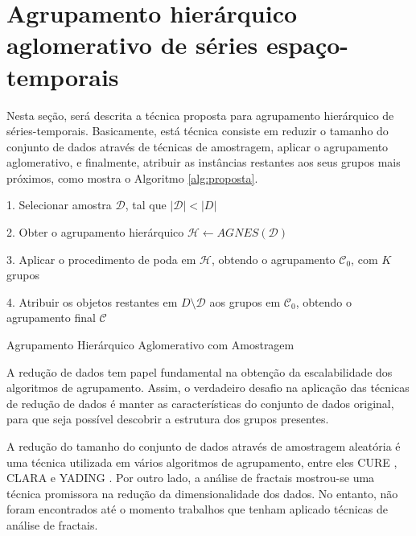 \section{Agrupamento hierárquico aglomerativo de séries espaço-temporais}

Nesta seção, será descrita a técnica proposta para agrupamento hierárquico de
séries-temporais. Basicamente, está técnica consiste em reduzir o tamanho do
conjunto de dados através de técnicas de amostragem, aplicar o agrupamento
aglomerativo, e finalmente, atribuir as instâncias restantes aos seus grupos
mais próximos, como mostra o Algoritmo \ref{alg:proposta}.

\begin{algorithm}
	1. Selecionar amostra $\mathcal{D}$,
		tal que $\left|\mathcal{D}\right| < \left|D\right|$ \;
		
	2. Obter o agrupamento hierárquico
		$\mathcal{H} \gets AGNES\left(\mathcal{D}\right)$ \;
		
	3. Aplicar o procedimento de poda em $\mathcal{H}$, obtendo
		o agrupamento $\mathcal{C}_0$, com $K$ grupos \;
		
	4. Atribuir os objetos restantes em $D \setminus \mathcal{D}$
		aos grupos em $\mathcal{C}_0$, obtendo o agrupamento final $\mathcal{C}$ \;
	
	\caption{Agrupamento Hierárquico Aglomerativo com Amostragem}
	\label{alg:proposta}
\end{algorithm}

A redução de dados tem papel fundamental na obtenção da escalabilidade dos
algoritmos de agrupamento. Assim, o verdadeiro desafio na aplicação das técnicas
de redução de dados é manter as características do conjunto de dados original,
para que seja possível descobrir a estrutura dos grupos presentes.

A redução do tamanho do conjunto de dados através de amostragem aleatória é uma
técnica utilizada em vários algoritmos de agrupamento, entre eles CURE
\cite{guha1998cure}, CLARA \cite{kaufman1990finding} e YADING \cite{Ding2015}.
Por outro lado, a análise de fractais mostrou-se uma técnica promissora na 
redução da dimensionalidade dos dados. No entanto, não foram encontrados até o
momento trabalhos que tenham aplicado técnicas de análise de fractais.